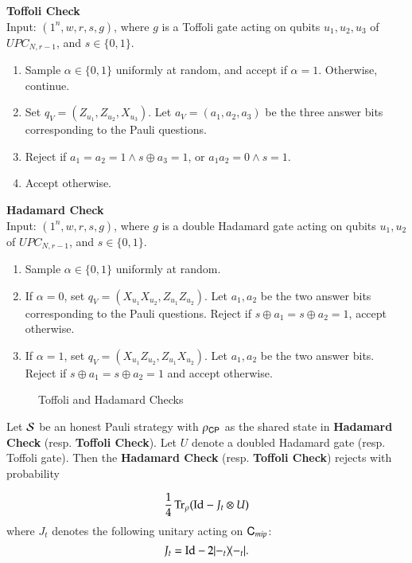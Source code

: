 \vspace{10pt}
\begin{center}
\begin{mdframed}
    \textbf{Toffoli Check} \\
	Input: $(1^n,w,r,s,g)$, where $g$ is a Toffoli gate acting on qubits $u_1,u_2,u_3$ of $UPC_{N,r-1}$, and $s \in \{0,1\}$. 
	\begin{enumerate}
		\item Sample $\alpha \in \{0,1\}$ uniformly at random, and accept if $\alpha = 1$. Otherwise, continue.
		\item Set $q_V = (Z_{u_1},Z_{u_2},X_{u_3})$. Let $a_V = (a_1,a_2,a_3)$ be the three answer bits corresponding to the Pauli questions.

		\item Reject if $a_1 = a_2 = 1 \wedge s \oplus a_3 = 1$, or $a_1 a_2 = 0 \wedge s = 1$.
		\item Accept otherwise.
	\end{enumerate}    
    \vspace{10pt}
\textbf{Hadamard Check} \\
	Input: $(1^n,w,r,s,g)$, where $g$ is a double Hadamard gate acting on qubits $u_1,u_2$ of $UPC_{N,r-1}$, and $s \in \{0,1\}$.

	\begin{enumerate}
		\item Sample $\alpha \in \{0,1\}$ uniformly at random.
		\item If $\alpha = 0$, set $q_V = ( X_{u_1} X_{u_2}, Z_{u_1} Z_{u_2})$. Let $a_1,a_2$ be the two answer bits corresponding to the Pauli questions. Reject if $s \oplus a_1 = s \oplus a_2 = 1$, accept otherwise.
		
		\item If $\alpha = 1$, set $q_V = (X_{u_1}Z_{u_2},Z_{u_1} X_{u_2})$. Let $a_1,a_2$ be the two answer bits. Reject if $s \oplus a_1 = s \oplus a_2 = 1$ and accept otherwise.
	\end{enumerate}    
\end{mdframed}

\end{center}
\begin{figure}[H]
\caption{Toffoli and Hadamard Checks}
\label{fig:toffoli_hadamard_check}
\end{figure}

\begin{lemma}
\label{lem:ver_gate_check}
	Let $\mathcal{S}$ be an honest Pauli strategy with $\rho_{{\mathsf{C}} {\mathsf{P}}}$ as the shared state in \textbf{Hadamard Check} (resp. \textbf{Toffoli Check}). Let $U$ denote a doubled Hadamard gate (resp. Toffoli gate). Then the \textbf{Hadamard Check} (resp. \textbf{Toffoli Check}) rejects with probability 
	
	\[
		\frac{1}{4} \operatorname{Tr}_{\rho} ( \mathop{\mathrm{Id}}\!\mathinner{} - J_t \otimes U )
	\]
	where $J_t$ denotes the following unitary acting on ${\mathsf{C}}_{mip}$:
	\[
		J_t = \mathop{\mathrm{Id}}\!\mathinner{} - 2|-_t\rangle\! \langle -_t|.
	\]
\end{lemma}


